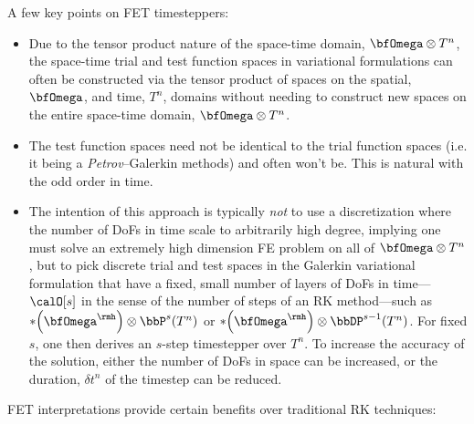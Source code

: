     A few key points on FET timesteppers:
    \begin{itemize}
        \item  Due to the tensor product nature of the space-time domain, $\bfOmega\otimes T^{n}$, the space-time trial and test function spaces in variational formulations can often be constructed via the tensor product of spaces on the spatial, $\bfOmega$, and time, $T^{n}$, domains without needing to construct new spaces on the entire space-time domain, $\bfOmega\otimes T^{n}$.
        \item  The test function spaces need not be identical to the trial function spaces (i.e. it being a \emph{Petrov}--Galerkin methods) and often won't be. This is natural with the odd order in time.
        \item  The intention of this approach is typically \emph{not} to use a discretization where the number of DoFs in time scale to arbitrarily high degree, implying one must solve an extremely high dimension FE problem on all of $\bfOmega\otimes T^{n}$, but to pick discrete trial and test spaces in the Galerkin variational formulation that have a fixed, small number of layers of DoFs in time---$\calO[s]$ in the sense of the number of steps of an RK method---such as $*\!\left(\bfOmega^{\rmh}\right)\otimes\bbP^{s}\!\left(T^{n}\right)$ or $*\!\left(\bfOmega^{\rmh}\right)\otimes\bbDP^{s - 1}\!\left(T^{n}\right)$. For fixed $s$, one then derives an $s$-step timestepper over $T^{n}$. To increase the accuracy of the solution, either the number of DoFs in space can be increased, or the duration, $\delta t^{n}$ of the timestep can be reduced.
    \end{itemize}
    FET interpretations provide certain benefits over traditional RK techniques:
